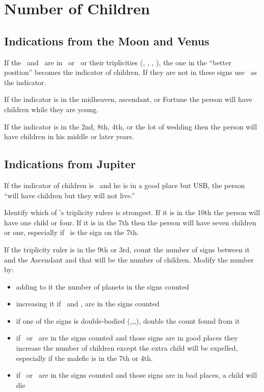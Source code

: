 \section{Number of Children}
\subsection{Indications from the Moon and Venus}
If the \Moon\, and \Venus\, are in \Cancer\, or \Capricorn\, or their triplicities (\Scorpio, \Pisces, \Taurus, \Virgo), the one in the ``better position'' becomes the indicator of children. If they are not in these signs use \Jupiter\, as the indicator.

If the indicator is in the midheaven, ascendant, or Fortune the person will have children while they are young. 

If the indicator is in the 2nd, 8th, 4th, or the lot of wedding then the person will have children in his middle or later years.

\subsection{Indications from Jupiter}
If the indicator of children is \Jupiter\, and he is in a good place but USB, the person ``will have children but they will not live.''

Identify which of \Jupiter's triplicity rulers is strongest. If it is in the 10th the person will have one child or four. If it is in the 7th then the person will have seven children or one, especially if \Aries\, is the sign on the 7th.

If the triplicity ruler is in the 9th or 3rd, count the number of signs between it and the Ascendant and that will be the number of children. Modify the number by:
\begin{itemize}[topsep=0em,itemsep=0em]
\item adding to it the number of planets in the signs counted
\item increasing it if \Jupiter\, and \Venus, are in the signs counted
\item if one of the signs is double-bodied (\Gemini,\Virgo,\Sagittarius,\Pisces), double the count found from it
\item if \Saturn\, or \Mars\, are in the signs counted and those signs are in good places they increase the number of children except the extra child will be expelled, especially if the malefic is in the 7th or 4th. 
\item if \Saturn\, or \Mars\, are in the signs counted and those signs are in bad places, a child will die
\end{itemize}






